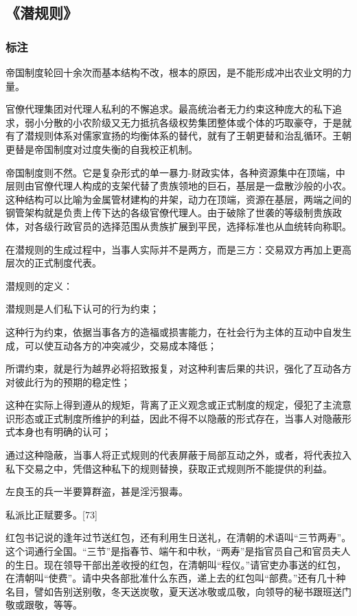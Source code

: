 \subsection{《潜规则》}

\subsubsection{标注}
帝国制度轮回十余次而基本结构不改，根本的原因，是不能形成冲出农业文明的力量。

官僚代理集团对代理人私利的不懈追求。最高统治者无力约束这种庞大的私下追求，弱小分散的小农阶级又无力抵抗各级权势集团整体或个体的巧取豪夺，于是就有了潜规则体系对儒家宣扬的均衡体系的替代，就有了王朝更替和治乱循环。王朝更替是帝国制度对过度失衡的自我校正机制。

帝国制度则不然。它是复杂形式的单一暴力-财政实体，各种资源集中在顶端，中层则由官僚代理人构成的支架代替了贵族领地的巨石，基层是一盘散沙般的小农。这种结构可以比喻为金属管材建构的井架，动力在顶端，资源在基层，两端之间的钢管架构就是负责上传下达的各级官僚代理人。由于破除了世袭的等级制贵族政体，对各级行政官员的选择范围从贵族扩展到平民，选择标准也从血统转向称职。

在潜规则的生成过程中，当事人实际并不是两方，而是三方：交易双方再加上更高层次的正式制度代表。

潜规则的定义：
\begin{enumerate*}
	\item 潜规则是人们私下认可的行为约束； 
	\item 这种行为约束，依据当事各方的造福或损害能力，在社会行为主体的互动中自发生成，可以使互动各方的冲突减少，交易成本降低； 
	\item 所谓约束，就是行为越界必将招致报复，对这种利害后果的共识，强化了互动各方对彼此行为的预期的稳定性； 
	\item 这种在实际上得到遵从的规矩，背离了正义观念或正式制度的规定，侵犯了主流意识形态或正式制度所维护的利益，因此不得不以隐蔽的形式存在，当事人对隐蔽形式本身也有明确的认可； 
	\item 通过这种隐蔽，当事人将正式规则的代表屏蔽于局部互动之外，或者，将代表拉入私下交易之中，凭借这种私下的规则替换，获取正式规则所不能提供的利益。
\end{enumerate*}

左良玉的兵一半要算群盗，甚是淫污狠毒。

私派比正赋要多。[73]

红包书记说的逢年过节送红包，还有利用生日送礼，在清朝的术语叫“三节两寿”。这个词通行全国。“三节”是指春节、端午和中秋，“两寿”是指官员自己和官员夫人的生日。现在领导干部出差收授的红包，在清朝叫“程仪。”请官吏办事送的红包，在清朝叫“使费”。请中央各部批准什么东西，递上去的红包叫“部费。”还有几十种名目，譬如告别送别敬，冬天送炭敬，夏天送冰敬或瓜敬，向领导的秘书跟班送门敬或跟敬，等等。

